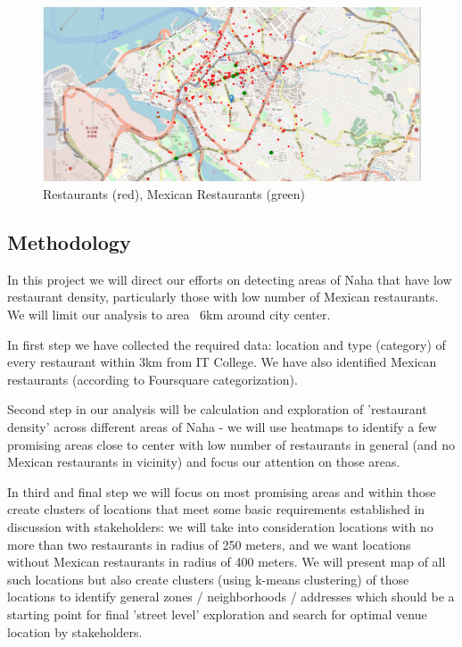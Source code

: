 \documentclass[11pt]{article}
\begin{document}
\begin{figure}[H]
    \centering
        \includegraphics[scale=.3]{figures/cm2.png}
    \caption{Restaurants (red), Mexican Restaurants (green)}
    \label{fig:1}
\end{figure}

\subsection{Methodology}

In this project we will direct our efforts on detecting areas of Naha that have low restaurant density, particularly those with low number of Mexican restaurants. We will limit our analysis to area ~6km around city center.

In first step we have collected the required data: location and type (category) of every restaurant within 3km from IT College. We have also identified Mexican restaurants (according to Foursquare categorization).

Second step in our analysis will be calculation and exploration of 'restaurant density' across different areas of Naha - we will use heatmaps to identify a few promising areas close to center with low number of restaurants in general (and no Mexican restaurants in vicinity) and focus our attention on those areas.

In third and final step we will focus on most promising areas and within those create clusters of locations that meet some basic requirements established in discussion with stakeholders: we will take into consideration locations with no more than two restaurants in radius of 250 meters, and we want locations without Mexican restaurants in radius of 400 meters. We will present map of all such locations but also create clusters (using k-means clustering) of those locations to identify general zones / neighborhoods / addresses which should be a starting point for final 'street level' exploration and search for optimal venue location by stakeholders.
\end{document}
